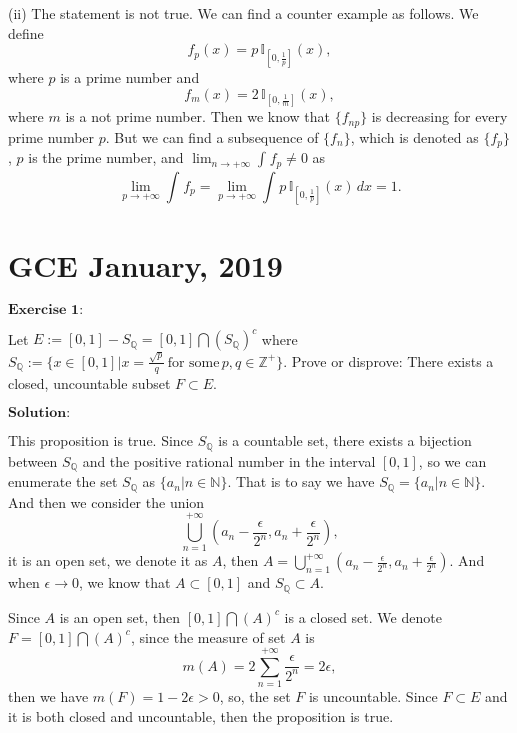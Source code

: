 \documentclass[12pt]{article}
\begin{document}
(ii) The statement is not true. We can find a counter example as follows. We define
\begin{equation*}
    f_{p} (x) = p \, \mathbb{I}_{[0, \frac{1}{p}]} (x),
\end{equation*}
where $p$ is a prime number and
\begin{equation*}
    f_{m} (x) = 2 \, \mathbb{I}_{[0, \frac{1}{m}]} (x),
\end{equation*}
where $m$ is a not prime number. Then we know that $\{f_{np}\}$ is decreasing for every prime number $p$. But we can find a subsequence of $\{f_{n}\}$, which is denoted as $\{f_{p}\}$, $p$ is the prime number, and $\lim_{n \to + \infty} \int_{}^{} f_{p} \neq 0$ as
\begin{equation*}
    \lim_{p \to + \infty} \int_{}^{} f_{p} = \lim_{p \to + \infty} \int_{}^{} p \, \mathbb{I}_{[0, \frac{1}{p}]} (x) \, d x = 1.
\end{equation*}

\newpage

\section{GCE January, 2019}

$\textbf{Exercise 1:}$

Let $E:= [0, 1] - S_{\mathbb{Q}} = [0, 1] \bigcap (S_{\mathbb{Q}})^{c}$ where $S_{\mathbb{Q}} := \{x \in [0, 1] | x = \frac{\sqrt{p}}{q}   \,  \text{for some} \, p, q \in \mathbb{Z}^{+} \}$. Prove or disprove: There exists a closed, uncountable subset $F \subset E$.

\vspace{8pt}

$\textbf{Solution:}$

This proposition is true. Since $S_{\mathbb{Q}}$ is a countable set, there exists a bijection between $S_{\mathbb{Q}}$ and the positive rational number in the interval $[0, 1]$, so we can enumerate the set $S_{\mathbb{Q}}$ as $\{a_{n} | n \in \mathbb{N} \}$. That is to say we have $S_{\mathbb{Q}} = \{a_{n} | n \in \mathbb{N} \}$. And then we consider the union 
$$\bigcup_{n = 1}^{+ \infty}(a_{n} - \frac{\epsilon}{2^{n}}, a_{n} + \frac{\epsilon}{2^{n}}),$$
it is an open set, we denote it as $A$, then $A = \bigcup_{n = 1}^{+ \infty}(a_{n} - \frac{\epsilon}{2^{n}}, a_{n} + \frac{\epsilon}{2^{n}})$. And when $\epsilon \to 0$, we know that $A \subset [0, 1]$ and $S_{\mathbb{Q}} \subset A$.

Since $A$ is an open set, then $[0, 1] \bigcap (A)^{c}$ is a closed set. We denote $F = [0, 1] \bigcap (A)^{c}$, since the measure of set $A$ is
\begin{equation*}
    m(A) = 2 \sum_{n = 1}^{+ \infty}  \frac{\epsilon}{2^{n}} = 2 \epsilon,
\end{equation*}
then we have $m(F) = 1 - 2 \epsilon > 0$, so, the set $F$ is uncountable. Since $F \subset E$ and it is both closed and uncountable, then the proposition is true.
\end{document}
